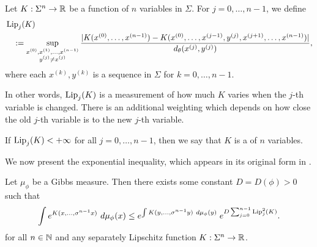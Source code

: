 \begin{definition}
	Let $K : \Sigma^n \to \mathbb{R}$ be a function of $n$ variables in $\Sigma$. For $j = 0, \dots, n - 1$, we define
	\begin{align*}
		&\operatorname{Lip}_j(K) \\ & \quad := \sup_{\substack{x^{(0)}, x^{(1)}, \dots, x^{(n - 1)} \\ y^{(j)} \neq x^{(j)}}} \frac{|K(x^{(0)}, \dots, x^{(n - 1)}) - K(x^{(0)}, \dots, x^{(j - 1)}, y^{(j)}, x^{(j + 1)}, \dots, x^{(n - 1)})|}{d_\theta(x^{(j)}, y^{(j)})},
	\end{align*}
	where each $x^{(k)}, y^{(k)}$ is a sequence in $\Sigma$ for $k = 0, \dots, n - 1$.
	
	In other words, $\operatorname{Lip}_j(K)$ is a measurement of how much $K$ varies when the $j$-th variable is changed. There is an additional weighting which depends on how close the old $j$-th variable is to the new $j$-th variable.
	
	If $\operatorname{Lip}_j(K) < +\infty$ for all $j = 0, \dots, n - 1$, then we say that $K$ is a  of $n$ variables.
\end{definition}

We now present the exponential inequality, which appears in its original form in \cite[Theorem I.1]{collet-martinez-schmitt:exp-ineq}.

\begin{theorem}\label{thm:cm-3-1}
	Let $\mu_\phi$ be a Gibbs measure. Then there exists some constant $D = D(\phi) > 0$ such that
	\begin{equation}\label{fml:cms-exp-ineq}
		\int{e^{K(x, \dots, \sigma^{n - 1}{x})}\ d\mu_\phi(x)} \leq e^{\int{K(y, \dots, \sigma^{n - 1}{y})\ d\mu_\phi(y)}} \; e^{D \sum_{j = 0}^{n - 1}{\operatorname{Lip}_j^2(K)}}.
	\end{equation}
	 for all $n \in \mathbb{N}$ and any separately Lipschitz function $K : \Sigma^n \to \mathbb{R}$.
\end{theorem}

